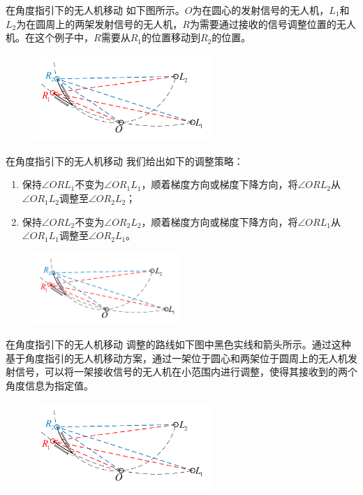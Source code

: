 \documentclass[aspectratio=169]{beamer}
\begin{document}
\begin{frame}{在角度指引下的无人机移动}
    如下图所示。$O$为在圆心的发射信号的无人机，$L_1$和$L_2$为在圆周上的两架发射信号的无人机，$R$为需要通过接收的信号调整位置的无人机。在这个例子中，$R$需要从$R_1$的位置移动到$R_2$的位置。
    \begin{figure}[!ht]
        \centering
        \includegraphics[width=0.6\textwidth]{图片/问题1-3示意图1.pdf}
    \end{figure}
\end{frame}

\begin{frame}{在角度指引下的无人机移动}
    我们给出如下的调整策略：
    \begin{enumerate}
        \item 保持$\angle ORL_1$不变为$\angle OR_1L_1$，顺着梯度方向或梯度下降方向，将$\angle ORL_2$从$\angle OR_1L_2$调整至$\angle OR_2L_2$；
        \item 保持$\angle ORL_2$不变为$\angle OR_2L_2$，顺着梯度方向或梯度下降方向，将$\angle ORL_1$从$\angle OR_1L_1$调整至$\angle OR_2L_1$。
    \end{enumerate}
    \begin{figure}[!ht]
        \centering
        \includegraphics[width=0.5\textwidth]{图片/问题1-3示意图1.pdf}
    \end{figure}
\end{frame}

\begin{frame}{在角度指引下的无人机移动}
    调整的路线如下图中黑色实线和箭头所示。通过这种基于角度指引的无人机移动方案，通过一架位于圆心和两架位于圆周上的无人机发射信号，可以将一架接收信号的无人机在小范围内进行调整，使得其接收到的两个角度信息为指定值。
    \begin{figure}[!ht]
        \centering
        \includegraphics[width=0.6\textwidth]{图片/问题1-3示意图1.pdf}
    \end{figure}
\end{frame}
\end{document}
